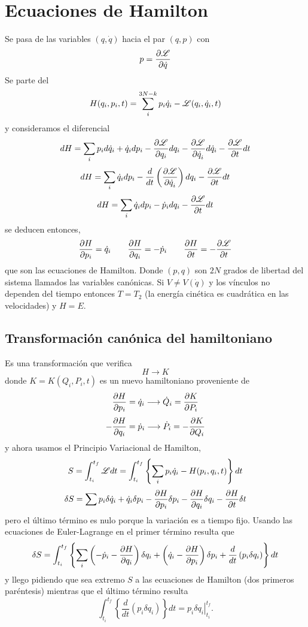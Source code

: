 \documentclass[10pt,oneside]{CBFT_book}
\begin{document}
\chapter{Ecuaciones de Hamilton}

Se pasa de las variables $(q, \dot{q})$ hacia el par $(q,p)$ con 
\[
	p = \dpar{\Lag}{\dot{q}}
\]
Se parte del 
\[
	H(q_i, p_i, t) = \sum_{i}^{3N-k} p_i \dot{q}_i - \Lag(q_i, \dot{q}_i, t)
\]
y consideramos el diferencial
\[
	dH = \sum_i p_i d\dot{q}_i + \dot{q}_i dp_i - \dpar{\Lag}{q_i} dq_i - \dpar{\Lag}{\dot{q}_i}d\dot{q}_i - \dpar{\Lag}{t}dt
\]
\[
	dH = \sum_i \dot{q}_i dp_i - \frac{d}{dt}\left( \dpar{\Lag}{\dot{q}_i} \right) dq_i - \dpar{\Lag}{t}dt
\]
\[
	dH = \sum_i \dot{q}_i dp_i - \dot{p}_i dq_i - \dpar{\Lag}{t}dt
\]
se deducen entonces,
\[
	\dpar{H}{p_i} = \dot{q}_i \qquad \dpar{H}{q_i} = -\dot{p}_i \qquad \dpar{H}{t} = -\dpar{\Lag}{t}
\]
que son las ecuaciones de Hamilton. Donde $(p,q)$ son $2N$ grados de libertad del sistema llamados las variables canónicas.
Si $V\neq V(\dot{q})$ y los vínculos no dependen del tiempo entonces $T=T_2$ (la energía cinética es cuadrática en las 
velocidades) y $H=E$.

\section{Transformación canónica del hamiltoniano}

Es una transformación que verifica
\[
	H \longrightarrow K
\]
donde $K=K(Q_i,P_i,t)$ es un nuevo hamiltoniano proveniente de
\[
	\dpar{H}{p_i} = \dot{q}_i \longrightarrow \dot{Q}_i = \dpar{K}{P_i}
\]
\[
	-\dpar{H}{q_i} = \dot{p}_i \longrightarrow \dot{P}_i = -\dpar{K}{Q_i}
\]
y ahora usamos el Principio Variacional de Hamilton,
\[
	S = \int_{t_i}^{t_f} \Lag dt = \int_{t_i}^{t_f}  \left\{ \sum_i p_i \dot{q}_i - H(p_i,q_i,t) \right\} dt
\]
\[
	\delta S = \sum p_i \delta \dot{q}_i +  \dot{q}_i \delta p_i  - \dpar{H}{p_i}\delta p_i 
	-\dpar{H}{q_i}\delta q_i  - \dpar{H}{t}\delta t
\]
pero el último término es nulo porque la variación es a tiempo fijo.
Usando las ecuaciones de Euler-Lagrange en el primer término resulta que 
\[
	\delta S = \int_{t_i}^{t_f}  \left\{ \sum_i \left(-\dot{p}_i -\dpar{H}{q_i} \right) \delta q_i +
	\left( \dot{q}_i - \dpar{H}{p_i} \right) \delta p_i + \frac{d}{dt}\left( p_i \delta q_i \right) \right\} dt
\]
y llego pidiendo que sea extremo $S$ a las ecuaciones de Hamilton (dos primeros paréntesis) mientras que el 
último término resulta 
\[
	\int_{t_i}^{t_f}  \left\{ \frac{d}{dt}\left( p_i \delta q_i \right) \right\} dt =
	\left. p_i \delta q_i \right|_{t_i}^{t_f}.
\]
\end{document}
